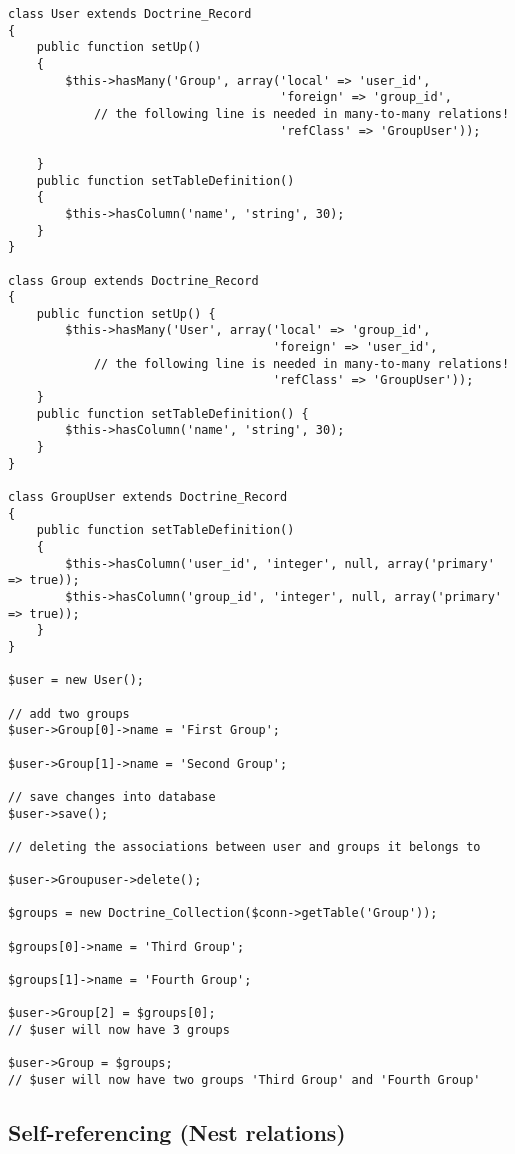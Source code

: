\documentclass[11pt,a4paper]{report}
\begin{document}
\begin{verbatim}
class User extends Doctrine_Record
{
    public function setUp()
    {
        $this->hasMany('Group', array('local' => 'user_id',
                                      'foreign' => 'group_id',
            // the following line is needed in many-to-many relations!
                                      'refClass' => 'GroupUser'));

    }
    public function setTableDefinition()
    {
        $this->hasColumn('name', 'string', 30);
    }
}

class Group extends Doctrine_Record
{
    public function setUp() {
        $this->hasMany('User', array('local' => 'group_id',
                                     'foreign' => 'user_id',
            // the following line is needed in many-to-many relations!
                                     'refClass' => 'GroupUser'));
    }
    public function setTableDefinition() {
        $this->hasColumn('name', 'string', 30);
    }
}

class GroupUser extends Doctrine_Record
{
    public function setTableDefinition()
    {
        $this->hasColumn('user_id', 'integer', null, array('primary' => true));
        $this->hasColumn('group_id', 'integer', null, array('primary' => true));
    }
}

$user = new User();

// add two groups
$user->Group[0]->name = 'First Group';

$user->Group[1]->name = 'Second Group';

// save changes into database
$user->save();

// deleting the associations between user and groups it belongs to

$user->Groupuser->delete();

$groups = new Doctrine_Collection($conn->getTable('Group'));

$groups[0]->name = 'Third Group';

$groups[1]->name = 'Fourth Group';

$user->Group[2] = $groups[0];
// $user will now have 3 groups

$user->Group = $groups;
// $user will now have two groups 'Third Group' and 'Fourth Group'
\end{verbatim}

\subsection{Self-referencing (Nest relations)}
\end{document}
